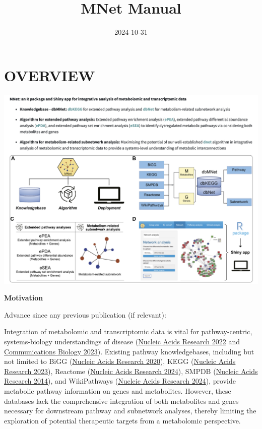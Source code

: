 \documentclass[
]{book}
\title{MNet Manual}
\author{}
\date{\vspace{-2.5em}2024-10-31}
\begin{document}
\maketitle

{
\setcounter{tocdepth}{1}
\tableofcontents
}
\chapter{OVERVIEW}\label{overview}

\begin{center}\includegraphics[width=27.58in]{figure/overview} \end{center}

\textbf{Motivation}

Advance since any previous publication (if relevant):

Integration of metabolomic and transcriptomic data is vital for pathway-centric, systems-biology understandings of disease (\href{https://doi.org/10.1093/nar/gkab1132}{Nucleic Acids Research 2022} and \href{https://doi.org/10.1038/s42003-023-05548-w}{Communications Biology 2023}). Existing pathway knowledgebases, including but not limited to BiGG (\href{https://doi.org/10.1093/nar/gkz1054}{Nucleic Acids Research 2020}), KEGG (\href{https://doi.org/10.1093/nar/gkac963}{Nucleic Acids Research 2023}), Reactome (\href{https://doi.org/10.1093/nar/gkad1025}{Nucleic Acids Research 2024}), SMPDB (\href{https://doi.org/10.1093/nar/gkt1067}{Nucleic Acids Research 2014}), and WikiPathways (\href{https://doi.org/10.1093/nar/gkad960}{Nucleic Acids Research 2024}), provide metabolic pathway information on genes and metabolites. However, these databases lack the comprehensive integration of both metabolites and genes necessary for downstream pathway and subnetwork analyses, thereby limiting the exploration of potential therapeutic targets from a metabolomic perspective.
\end{document}
